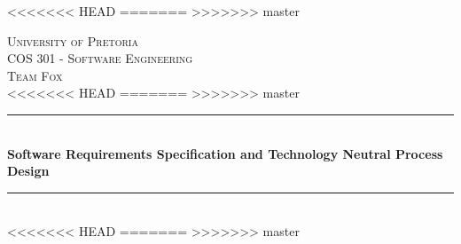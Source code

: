 \documentclass[a4paper,12pt]{article}
\begin{document}
\begin{titlepage}

\newcommand{\HRule}{\rule{\linewidth}{0.5mm}} %

\center %
 
<<<<<<< HEAD
=======
>>>>>>> master

\textsc{\LARGE University of Pretoria}\\[1.5cm]
\textsc{\Large COS 301 - Software Engineering}\\[0.5cm]
\textsc{\large Team Fox}\\[0.5cm]

<<<<<<< HEAD
=======
>>>>>>> master

\HRule \\[0.4cm]
{ \huge \bfseries Software Requirements Specification and Technology Neutral Process Design}\\[0.4cm] %
\HRule \\[1.5cm]
 
<<<<<<< HEAD
=======
>>>>>>> master


\end{titlepage}
\end{document}
